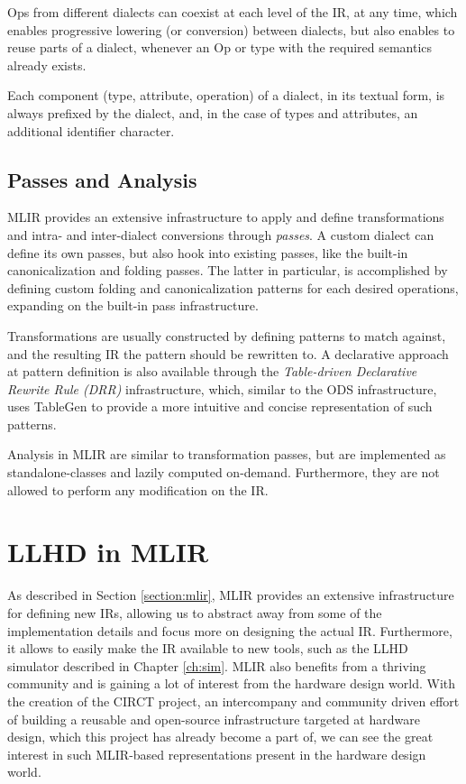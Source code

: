 Ops from different dialects can coexist at each level of the IR, at any time, which enables progressive lowering (or conversion) between dialects, but also enables to reuse parts of a dialect, whenever an Op or type with the required semantics already exists.

Each component (type, attribute, operation) of a dialect, in its textual form, is always prefixed by the dialect, and, in the case of types and attributes, an additional identifier character.

\subsection{Passes and Analysis}
\label{sec:pass}
MLIR provides an extensive infrastructure to apply and define transformations and intra- and inter-dialect conversions through \textit{passes}. A custom dialect can define its own passes, but also hook into existing passes, like the built-in canonicalization and folding passes. The latter in particular, is accomplished by defining custom folding and canonicalization patterns for each desired operations, expanding on the built-in pass infrastructure.

Transformations are usually constructed by defining patterns to match against, and the resulting IR the pattern should be rewritten to. A declarative approach at pattern definition is also available through the \textit{Table-driven Declarative Rewrite Rule (DRR)} infrastructure, which, similar to the ODS infrastructure, uses TableGen to provide a more intuitive and concise representation of such patterns.

Analysis in MLIR are similar to transformation passes, but are implemented as standalone-classes and lazily computed on-demand. Furthermore, they are not allowed to perform any modification on the IR.


\section{LLHD in MLIR}
\label{section:llhdmlir}
As described in Section \ref{section:mlir}, MLIR provides an extensive infrastructure for defining new IRs, allowing us to abstract away from some of the implementation details and focus more on designing the actual IR. Furthermore, it allows to easily make the IR available to new tools, such as the LLHD simulator described in Chapter \ref{ch:sim}. MLIR also benefits from a thriving community and is gaining a lot of interest from the hardware design world. With the creation of the CIRCT project, an intercompany and community driven effort of building a reusable and open-source infrastructure targeted at hardware design, which this project has already become a part of, we can see the great interest in such MLIR-based representations present in the hardware design world.

